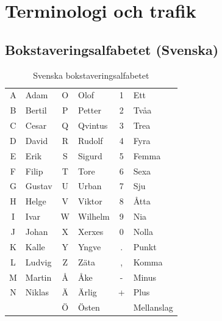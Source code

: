\clearpage


\section{Terminologi och trafik}

\subsection{Bokstaveringsalfabetet (Svenska)}

\begin{table}[H]
	\centering
\begin{longtable}{cl|cl|cl }
	A & Adam   & O & Olof    & 1 & Ett        \\
	B & Bertil & P & Petter  & 2 & Tvåa       \\
	C & Cesar  & Q & Qvintus & 3 & Trea       \\
	D & David  & R & Rudolf  & 4 & Fyra       \\
	E & Erik   & S & Sigurd  & 5 & Femma      \\
	F & Filip  & T & Tore    & 6 & Sexa       \\
	G & Gustav & U & Urban   & 7 & Sju        \\
	H & Helge  & V & Viktor  & 8 & Åtta       \\
	I & Ivar   & W & Wilhelm & 9 & Nia        \\
	J & Johan  & X & Xerxes  & 0 & Nolla      \\
	K & Kalle  & Y & Yngve   & . & Punkt      \\
	L & Ludvig & Z & Zäta    & , & Komma      \\
	M & Martin & Å & Åke     & - & Minus      \\
	N & Niklas & Ä & Ärlig   & + & Plus       \\
	  &        & Ö & Östen   &   & Mellanslag \\
\end{longtable}
\caption{Svenska bokstaveringsalfabetet}
\end{table}


